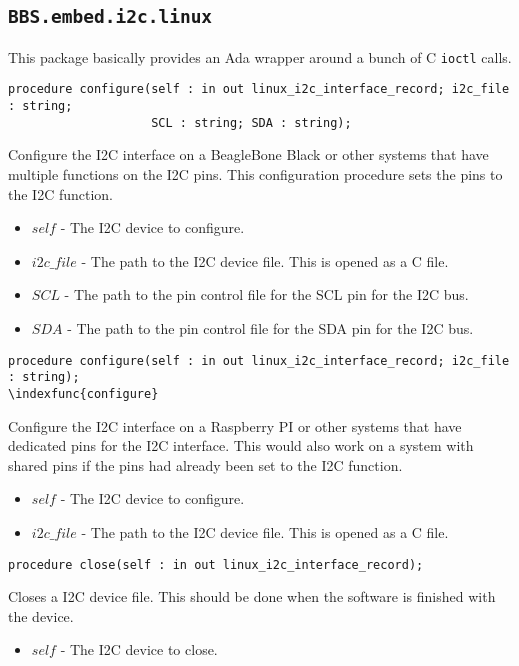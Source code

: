 \documentclass[10pt, openany]{book}
\newcommand{\indexfunc}[1]{\index[func]{#1}}
\newcommand{\package}[1]{\texttt{#1}}
\newcommand{\function}[1]{\texttt{#1}}
\begin{document}
\subsection{\package{BBS.embed.i2c.linux}}
This package basically provides an Ada wrapper around a bunch of C \function{ioctl} calls.
\begin{lstlisting}
procedure configure(self : in out linux_i2c_interface_record; i2c_file : string;
                    SCL : string; SDA : string);
\end{lstlisting}
\indexfunc{configure}
Configure the I2C interface on a BeagleBone Black or other systems that have multiple functions on the I2C pins.  This configuration procedure sets the pins to the I2C function.
\begin{itemize}
  \item $self$ - The I2C device to configure.
  \item $i2c\_file$ - The path to the I2C device file.  This is opened as a C file.
  \item $SCL$ - The path to the pin control file for the SCL pin for the I2C bus.
  \item $SDA$ - The path to the pin control file for the SDA pin for the I2C bus.
\end{itemize}

\begin{lstlisting}
procedure configure(self : in out linux_i2c_interface_record; i2c_file : string);
\indexfunc{configure}
\end{lstlisting}
Configure the I2C interface on a Raspberry PI or other systems that have dedicated pins for the I2C interface.  This would also work on a system with shared pins if the pins had already been set to the I2C function.
\begin{itemize}
  \item $self$ - The I2C device to configure.
  \item $i2c\_file$ - The path to the I2C device file.  This is opened as a C file.
\end{itemize}

\begin{lstlisting}
procedure close(self : in out linux_i2c_interface_record);
\end{lstlisting}
\indexfunc{close}
Closes a I2C device file.  This should be done when the software is finished with the device.
\begin{itemize}
  \item $self$ - The I2C device to close.
\end{itemize}
\end{document}
